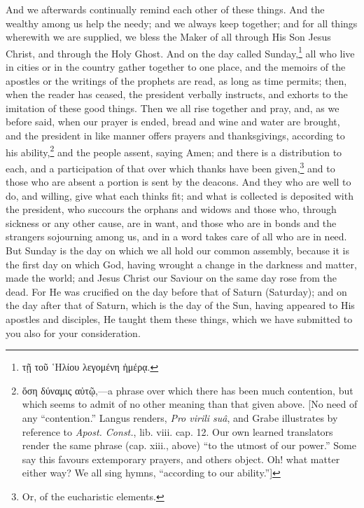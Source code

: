 
And we afterwards continually remind each other of these things. And the wealthy among us help the needy; and we always keep together; and for all things wherewith we are supplied, we bless the Maker of all through His Son  Jesus Christ, and through the Holy Ghost. And on the day called Sunday,\footnote{\textgreek{τῇ τοῦ ῾Ηλίου λεγομένη ἡμέρᾳ}.} all who live in cities or in the country gather together to one place, and the memoirs of the apostles or the writings of the prophets are read, as long as time permits; then, when the reader has ceased, the president verbally instructs, and exhorts to the imitation of these good things. Then we all rise together and pray, and, as we before said, when our prayer is ended, bread and wine and water are brought, and the president in like manner offers prayers and thanksgivings, according to his ability,\footnote{\textgreek{ὅση δύναμις αὐτῷ,}—a phrase over which there has been much contention, but which seems to admit of no other meaning than that given above. [No need of any “contention.” Langus renders, \emph{Pro virili suâ}, and Grabe illustrates by reference to \emph{Apost. Const.}, lib. viii. cap. 12. Our own learned translators render the same phrase (cap. xiii., above) “to the utmost of our power.” Some say this favours extemporary prayers, and others object. Oh! what matter either way? We all sing hymns, “according to our ability.”]} and the people assent, saying Amen; and there is a distribution to each, and a participation of that over which thanks have been given,\footnote{Or, of the eucharistic elements.} and to those who are absent a portion is sent by the deacons. And they who are well to do, and willing, give what each thinks fit; and what is collected is deposited with the president, who succours the orphans and widows and those who, through sickness or any other cause, are in want, and those who are in bonds and the strangers sojourning among us, and in a word takes care of all who are in need. But Sunday is the day on which we all hold our common assembly, because it is the first day on which God, having wrought a change in the darkness and matter, made the world; and Jesus Christ our Saviour on the same day rose from the dead. For He was crucified on the day before that of Saturn (Saturday); and on the day after that of Saturn, which is the day of the Sun, having appeared to His apostles and disciples, He taught them these things, which we have submitted to you also for your consideration.


